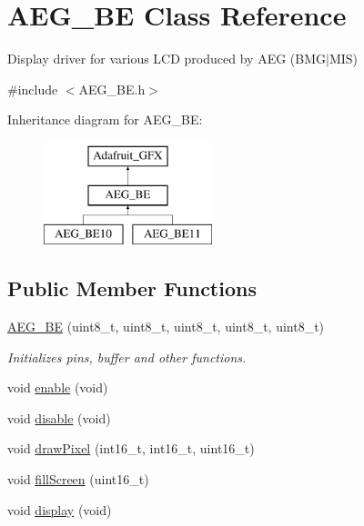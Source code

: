 \hypertarget{class_a_e_g___b_e}{}\section{A\+E\+G\+\_\+\+BE Class Reference}
\label{class_a_e_g___b_e}


Display driver for various L\+CD produced by A\+EG (B\+M\+G$\vert$\+M\+IS)  




{\ttfamily \#include $<$A\+E\+G\+\_\+\+B\+E.\+h$>$}

Inheritance diagram for A\+E\+G\+\_\+\+BE\+:\begin{figure}[H]
\begin{center}
\leavevmode
\includegraphics[height=3.000000cm]{class_a_e_g___b_e}
\end{center}
\end{figure}
\subsection*{Public Member Functions}
\begin{DoxyCompactItemize}
\item 
\mbox{\hyperlink{class_a_e_g___b_e_a85bd3c991a670cf65ed70bca2af49413}{A\+E\+G\+\_\+\+BE}} (uint8\+\_\+t, uint8\+\_\+t, uint8\+\_\+t, uint8\+\_\+t, uint8\+\_\+t)
\begin{DoxyCompactList}\small\item\em Initializes pins, buffer and other functions. \end{DoxyCompactList}\item 
void \mbox{\hyperlink{class_a_e_g___b_e_aa8755698903c6e198ca1a07788541d1a}{enable}} (void)
\item 
void \mbox{\hyperlink{class_a_e_g___b_e_a340ce74a24ba0dc26c05519a7f865f3c}{disable}} (void)
\item 
void \mbox{\hyperlink{class_a_e_g___b_e_a1256522fd3165e2894b59fee10eab621}{draw\+Pixel}} (int16\+\_\+t, int16\+\_\+t, uint16\+\_\+t)
\item 
void \mbox{\hyperlink{class_a_e_g___b_e_a26979ef08f0e328d092fecb132da511b}{fill\+Screen}} (uint16\+\_\+t)
\item 
void \mbox{\hyperlink{class_a_e_g___b_e_a01f3830d43086806b1e58a4401268d40}{display}} (void)
\end{DoxyCompactItemize}


